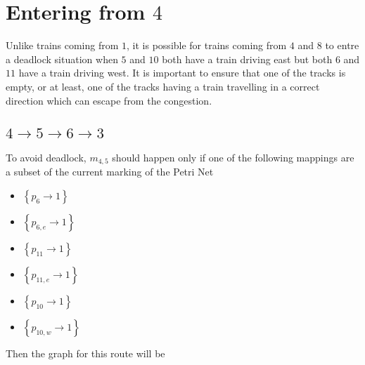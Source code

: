 \documentclass[12pt]{article}
\begin{document}
\section{Entering from $4$}

Unlike trains coming from $1$, it is possible for trains coming from $4$ and $8$ to entre a deadlock situation when $5$ and $10$ both have a train driving east but both $6$ and $11$ have a train driving west. It is important to ensure that one of the tracks is empty, or at least, one of the tracks having a train travelling in a correct direction which can escape from the congestion.

\subsection{$4 \rightarrow 5 \rightarrow 6 \rightarrow 3$}

To avoid deadlock, $m_{4,5}$ should happen only if one of the following mappings are a subset of the current marking of the Petri Net

\begin{itemize}
  \item $\left\{ p_6 \rightarrow 1 \right\}$
  \item $\left\{ p_{6,e} \rightarrow 1 \right\}$
  \item $\left\{ p_{11} \rightarrow 1 \right\}$
  \item $\left\{ p_{11,e} \rightarrow 1 \right\}$
  \item $\left\{ p_{10} \rightarrow 1 \right\}$
  \item $\left\{ p_{10,w} \rightarrow 1 \right\}$
\end{itemize}

Then the graph for this route will be
\end{document}
